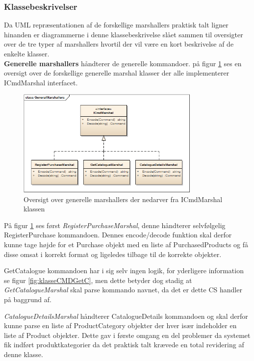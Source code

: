 \subsubsection{Klassebeskrivelser}
Da UML repræsentationen af de forskellige marshallers praktisk talt ligner hinanden er diagrammerne i denne klassebeskrivelse slået sammen til oversigter over de tre typer af marshallers hvortil der vil være en kort beskrivelse af de enkelte klasser.\\

\textbf{Generelle marshallers} håndterer de generelle kommandoer. på figur \ref{fig:overklasseMarsGen} ses en oversigt over de forskellige generelle marshal klasser der alle implementerer ICmdMarshal interfacet.

\begin{figure}[H]
	\centering
	\includegraphics[width=0.8\textwidth]{Systemdesign/SharedLib/Images/Marshallers/GeneralMarshallers2.png}
	\caption{Oversigt over generelle marshallers der nedarver fra ICmdMarshal klassen}
	\label{fig:overklasseMarsGen}
\end{figure}

På figur \ref{fig:overklasseMarsGen} ses først \textit{RegisterPurchaseMarshal}, denne håndterer selvfølgelig RegisterPurchase kommandoen. Dennes encode/decode funktion skal derfor kunne tage højde for et Purchase objekt med en liste af PurchasedProducts og få disse omsat i korrekt format og ligeledes tilbage til de korrekte objekter. 

GetCatalogue kommandoen har i sig selv ingen logik, for yderligere information se figur \ref{fig:klasseCMDGetC}, men dette betyder dog stadig at \textit{GetCatalogueMarshal} skal parse kommando navnet, da det er dette \gls{CS} handler på baggrund af. 

\textit{CatalogueDetailsMarshal} håndterer CatalogueDetails kommandoen og skal derfor kunne parse en liste af ProductCategory objekter der hver især indeholder en liste af Product objekter. Dette gav i første omgang en del problemer da systemet fik indført produktkategorier da det praktisk talt krævede en total revidering af denne klasse.\\


